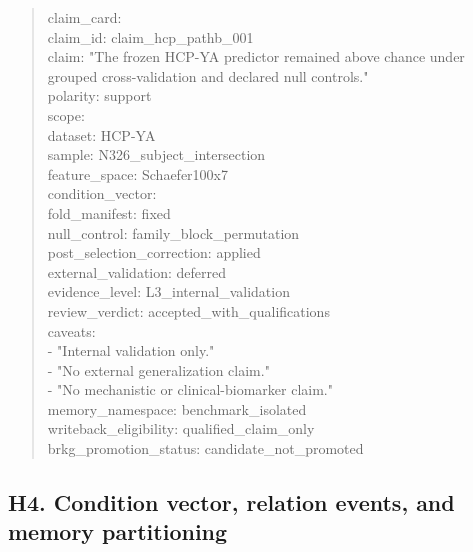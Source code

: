 \begin{quote}
claim\_\allowbreak{}card:\\
claim\_\allowbreak{}id: claim\_\allowbreak{}hcp\_\allowbreak{}pathb\_\allowbreak{}001\\
claim: "The frozen HCP-YA predictor remained above chance under grouped cross-validation and declared null controls."\\
polarity: support\\
scope:\\
dataset: HCP-YA\\
sample: N326\_\allowbreak{}subject\_\allowbreak{}intersection\\
feature\_\allowbreak{}space: Schaefer100x7\\
condition\_\allowbreak{}vector:\\
fold\_\allowbreak{}manifest: fixed\\
null\_\allowbreak{}control: family\_\allowbreak{}block\_\allowbreak{}permutation\\
post\_\allowbreak{}selection\_\allowbreak{}correction: applied\\
external\_\allowbreak{}validation: deferred\\
evidence\_\allowbreak{}level: L3\_\allowbreak{}internal\_\allowbreak{}validation\\
review\_\allowbreak{}verdict: accepted\_\allowbreak{}with\_\allowbreak{}qualifications\\
caveats:\\
- "Internal validation only."\\
- "No external generalization claim."\\
- "No mechanistic or clinical-biomarker claim."\\
memory\_\allowbreak{}namespace: benchmark\_\allowbreak{}isolated\\
writeback\_\allowbreak{}eligibility: qualified\_\allowbreak{}claim\_\allowbreak{}only\\
brkg\_\allowbreak{}promotion\_\allowbreak{}status: candidate\_\allowbreak{}not\_\allowbreak{}promoted
\end{quote}

\subsection{\texorpdfstring{\textbf{H4. Condition vector, relation events, and memory partitioning}}{H4. Condition vector, relation events, and memory partitioning}}\label{h4.-condition-vector-relation-events-and-memory-partitioning}

